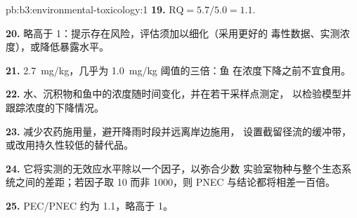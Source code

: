 \begin{solution}{pb:b3:environmental-toxicology:1}
\textbf{19.} $\mathrm{RQ} = 5.7/5.0 = 1.1$.

\textbf{20.} 略高于 1：提示存在风险，评估须加以细化（采用更好的
毒性数据、实测浓度），或降低暴露水平。

\textbf{21.} \qty{2.7}{mg/kg}，几乎为 \qty{1.0}{mg/kg} 阈值的三倍：鱼
在浓度下降之前不宜食用。

\textbf{22.} 水、沉积物和鱼中的浓度随时间变化，并在若干采样点测定，
以检验模型并跟踪浓度的下降情况。

\textbf{23.} 减少农药施用量，避开降雨时段并远离岸边施用，
设置截留径流的缓冲带，或改用持久性较低的替代品。

\textbf{24.} 它将实测的无效应水平除以一个因子，以弥合少数
实验室物种与整个生态系统之间的差距；若因子取 10 而非 1000，则
PNEC 与结论都将相差一百倍。

\textbf{25.}  PEC/PNEC 约为 1.1，略高于 1。
\end{solution}
